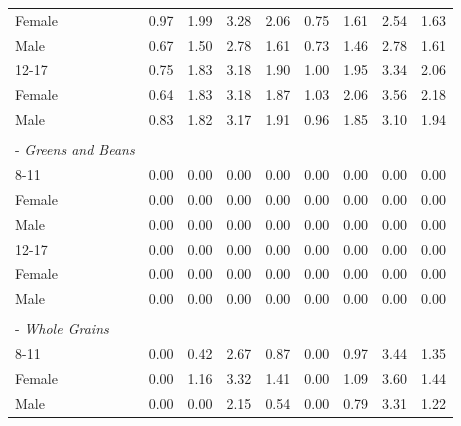 \documentclass[12pt,leqno,titlepage]{amsart}
\newcommand{\1}{\mathbbm{1}}
\begin{document}
\begin{bibunit}
\begin{longtable}{@{\extracolsep{\fill}}lcccc|cccc@{}}
\hspace*{4.4em}Female & 0.97 & 1.99 & 3.28 & 2.06 & 0.75 & 1.61 & 2.54 & 1.63 \\
\hspace*{4.4em}Male & 0.67 & 1.50 & 2.78 & 1.61 & 0.73 & 1.46 & 2.78 & 1.61 \\
\hspace*{2.2em}12-17 & 0.75 & 1.83 & 3.18 & 1.90 & 1.00 & 1.95 & 3.34 & 2.06 \\
\hspace*{4.4em}Female & 0.64 & 1.83 & 3.18 & 1.87 & 1.03 & 2.06 & 3.56 & 2.18 \\
\hspace*{4.4em}Male & 0.83 & 1.82 & 3.17 & 1.91 & 0.96 & 1.85 & 3.10 & 1.94 \\
\rule{0pt}{1.1em} & & & & & & & & \\
\hspace*{0.8em}- \textit{Greens and Beans} & & & & & & & & \\
\hspace*{2.2em}8-11 & 0.00 & 0.00 & 0.00 & 0.00 & 0.00 & 0.00 & 0.00 & 0.00 \\
\hspace*{4.4em}Female & 0.00 & 0.00 & 0.00 & 0.00 & 0.00 & 0.00 & 0.00 & 0.00 \\
\hspace*{4.4em}Male & 0.00 & 0.00 & 0.00 & 0.00 & 0.00 & 0.00 & 0.00 & 0.00 \\
\hspace*{2.2em}12-17 & 0.00 & 0.00 & 0.00 & 0.00 & 0.00 & 0.00 & 0.00 & 0.00 \\
\hspace*{4.4em}Female & 0.00 & 0.00 & 0.00 & 0.00 & 0.00 & 0.00 & 0.00 & 0.00 \\
\hspace*{4.4em}Male & 0.00 & 0.00 & 0.00 & 0.00 & 0.00 & 0.00 & 0.00 & 0.00 \\
\rule{0pt}{1.1em} & & & & & & & & \\
\hspace*{0.8em}- \textit{Whole Grains} & & & & & & & & \\
\hspace*{2.2em}8-11 & 0.00 & 0.42 & 2.67 & 0.87 & 0.00 & 0.97 & 3.44 & 1.35 \\
\hspace*{4.4em}Female & 0.00 & 1.16 & 3.32 & 1.41 & 0.00 & 1.09 & 3.60 & 1.44 \\
\hspace*{4.4em}Male & 0.00 & 0.00 & 2.15 & 0.54 & 0.00 & 0.79 & 3.31 & 1.22 \\

\end{longtable}
\end{bibunit}
\end{document}
